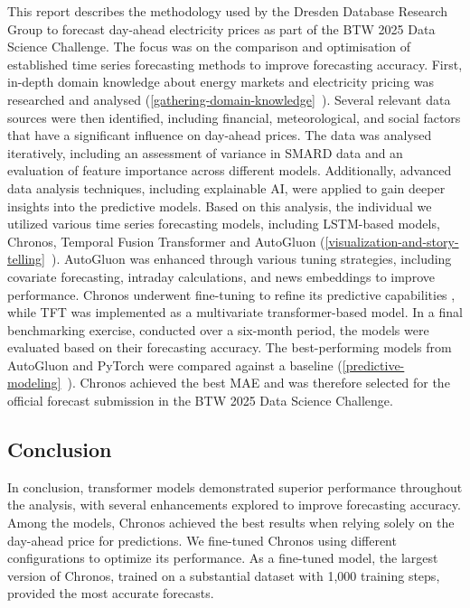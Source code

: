 \documentclass[a4paper]{article}
\begin{document}
This report describes the methodology used by the Dresden Database
Research Group to forecast day-ahead electricity prices as part of the
BTW 2025 Data Science Challenge. The focus was on the comparison and
optimisation of established time series forecasting methods to improve
forecasting accuracy. First, in-depth domain knowledge about energy
markets and electricity pricing was researched and analysed (\ref{gathering-domain-knowledge}~). Several relevant data sources were then identified,
including financial, meteorological, and social factors that have a
significant influence on day-ahead prices. The data was analysed
iteratively, including an assessment of variance in SMARD data and an
evaluation of feature importance across different models. Additionally,
advanced data analysis techniques, including explainable AI, were
applied to gain deeper insights into the predictive models. Based on
this analysis, the individual we utilized various time series
forecasting models, including LSTM-based models, Chronos, Temporal
Fusion Transformer and AutoGluon (\ref{visualization-and-story-telling}~).
AutoGluon was enhanced through various tuning strategies, including
covariate forecasting, intraday calculations, and news embeddings to
improve performance. Chronos underwent fine-tuning to refine its
predictive capabilities , while TFT was implemented as a multivariate
transformer-based model. In a final benchmarking exercise, conducted
over a six-month period, the models were evaluated based on their
forecasting accuracy. The best-performing models from AutoGluon and
PyTorch were compared against a baseline (\ref{predictive-modeling}~).
Chronos achieved the best MAE and was therefore selected for the
official forecast submission in the BTW 2025 Data Science Challenge.

    \subsection{Conclusion}\label{conclusion}

In conclusion, transformer models demonstrated superior performance
throughout the analysis, with several enhancements explored to improve
forecasting accuracy. Among the models, Chronos achieved the best
results when relying solely on the day-ahead price for predictions. We
fine-tuned Chronos using different configurations to optimize its
performance. As a fine-tuned model, the largest version of Chronos,
trained on a substantial dataset with 1,000 training steps, provided the
most accurate forecasts.
\end{document}
